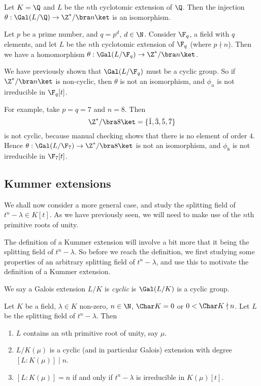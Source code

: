 \documentclass[a4paper]{article}
\begin{document}
\begin{cor}
  Let $K = \Q$ and $L$ be the $n$th cyclotomic extension of $\Q$. Then the injection $\theta: \Gal(L/\Q) \to \Z^*/\bra n\ket$ is an isomorphism.
\end{cor}

\begin{eg}
  Let $p$ be a prime number, and $q = p^d$, $d \in \N$. Consider $\F_q$, a field with $q$ elements, and let $L$ be the $n$th cyclotomic extension of $\F_q$ (where $p\nmid n$). Then we have a homomorphism $\theta: \Gal(L/\F_q) \rightarrow \Z^*/\bra n\ket$.

  We have previously shown that $\Gal(L/\F_q)$ must be a cyclic group. So if $\Z^*/\bra n\ket$ is non-cyclic, then $\theta$ is not an isomorphism, and $\phi_n$ is not irreducible in $\F_q[t]$.

  For example, take $p = q = 7$ and $n = 8$. Then
  \[
    \Z^*/\bra 8\ket = \{\bar{1}, \bar{3}, \bar{5}, \bar{7}\}
  \]
  is not cyclic, because manual checking shows that there is no element of order $4$. Hence $\theta: \Gal(L/\F_7) \to \Z^*/\bra 8\ket$ is not an isomorphism, and $\phi_8$ is not irreducible in $\F_7[t]$.
\end{eg}

\subsection{Kummer extensions}
We shall now consider a more general case, and study the splitting field of $t^n - \lambda \in K[t]$. As we have previously seen, we will need to make use of the $n$th primitive roots of unity.

The definition of a Kummer extension will involve a bit more that it being the splitting field of $t^n - \lambda$. So before we reach the definition, we first studying some properties of an arbitrary splitting field of $t^n - \lambda$, and use this to motivate the definition of a Kummer extension.

\begin{defi}
  We say a Galois extension $L/K$ is \emph{cyclic} is $\Gal(L/K)$ is a cyclic group.
\end{defi}

\begin{thm}
  Let $K$ be a field, $\lambda \in K$ non-zero, $n \in \N$, $\Char K = 0$ or $0 < \Char K \nmid n$. Let $L$ be the splitting field of $t^n - \lambda$. Then
  \begin{enumerate}
    \item $L$ contains an $n$th primitive root of unity, say $\mu$.
    \item $L/K(\mu)$ is a cyclic (and in particular Galois) extension with degree $[L:K(\mu)] \mid n$.
    \item $[L:K(\mu)] = n$ if and only if $t^n - \lambda$ is irreducible in $K(\mu)[t]$.
  \end{enumerate}
\end{thm}
\end{document}
